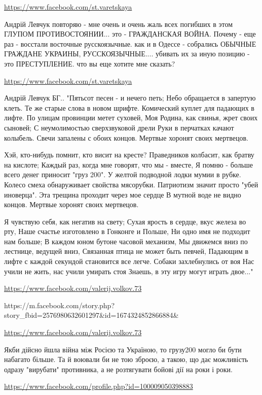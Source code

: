 \documentclass[a4paper,11pt]{extreport}
\begin{document}
\begin{itemize}
\begin{itemize}
\url{https://www.facebook.com/st.varetskaya}

Андрій Левчук повторяю - мне очень и очень жаль всех погибших в этом ГЛУПОМ ПРОТИВОСТОЯНИИ... это - ГРАЖДАНСКАЯ ВОЙНА. Почему - еще раз - восстали восточные русскоязычные. как и в Одессе - собрались ОБЫЧНЫЕ ГРАЖДАНЕ УКРАИНЫ, РУССКОЯЗЫЧНЫЕ.... убивать их за иную позицию - это ПРЕСТУПЛЕНИЕ. что вы еще хотите мне сказать?

\url{https://www.facebook.com/st.varetskaya}

Андрій Левчук БГ..
"Пятьсот песен - и нечего петь;
Небо обращается в запертую клеть.
Те же старые слова в новом шрифте.
Комический куплет для падающих в лифте.
По улицам провинции метет суховей,
Моя Родина, как свинья, жрет своих сыновей;
С неумолимостью сверхзвуковой дрели
Руки в перчатках качают колыбель.
Свечи запалены с обоих концов.
Мертвые хоронят своих мертвецов.

Хэй, кто-нибудь помнит, кто висит на кресте?
Праведников колбасит, как братву на кислоте;
Каждый раз, когда мне говорят, что мы - вместе,
Я помню - больше всего денег приносит "груз 200".
У желтой подводной лодки мумии в рубке.
Колесо смеха обнаруживает свойства мясорубки.
Патриотизм значит просто "убей иноверца".
Эта трещина проходит через мое сердце
В мутной воде не видно концов.
Мертвые хоронят своих мертвецов.

Я чувствую себя, как негатив на свету;
Сухая ярость в сердце, вкус железа во рту,
Наше счастье изготовлено в Гонконге и Польше,
Ни одно имя не подходит нам больше;
В каждом юном бутоне часовой механизм,
Мы движемся вниз по лестнице, ведущей вниз,
Связанная птица не может быть певчей,
Падающим в лифте с каждой секундой становится все легче.
Собаки захлебнулись от воя
Нас учили не жить, нас учили умирать стоя
Знаешь, в эту игру могут играть двое..."

\url{https://www.facebook.com/valerij.volkov.73}

https://m.facebook.com/story.php?story_fbid=2576980632601297&id=1674324852866884&

\url{https://www.facebook.com/valerij.volkov.73}

Якби дійсно йшла війна між Росією та Україною, то грузу200 могло би бути набагато більше. Та й воювали би не тою зброєю, а такою, що дає можливість одразу "вирубати" противника, а не розтягувати бойові дії на роки і роки.

\end{itemize}
\url{https://www.facebook.com/profile.php?id=100009050398883}


\end{itemize}
\end{document}
